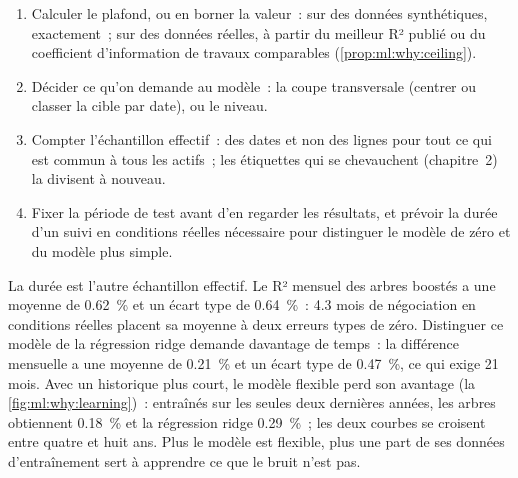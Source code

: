 \begin{method}\label{met:ml:why:before}
\begin{enumerate}
\item Calculer le plafond, ou en borner la valeur~: sur des données synthétiques, exactement~; sur des données réelles, à partir du meilleur R² publié ou
du coefficient d'information de travaux comparables (\cref{prop:ml:why:ceiling}).
\item Décider ce qu'on demande au modèle~: la coupe transversale (centrer ou classer la cible par date), ou le niveau.
\item Compter l'échantillon effectif~: des dates et non des lignes pour tout ce qui est commun à tous les actifs~; les étiquettes qui se chevauchent
(chapitre~2) la divisent à nouveau.
\item Fixer la période de test avant d'en regarder les résultats, et prévoir la durée d'un suivi en conditions réelles nécessaire pour distinguer le modèle de zéro et
du modèle plus simple.
\end{enumerate}
\end{method}

La durée est l'autre échantillon effectif. Le R² mensuel des arbres boostés a une moyenne de 0.62~\% et un écart type
de 0.64~\%~: 4.3 mois de négociation en conditions réelles placent sa moyenne à deux erreurs types de zéro. Distinguer ce modèle de la régression ridge demande
davantage de temps~: la différence mensuelle a une moyenne de 0.21~\% et un écart type de 0.47~\%, ce qui exige 21 mois. Avec un historique plus court, le modèle
flexible perd son avantage (la \cref{fig:ml:why:learning})~: entraînés sur les seules deux dernières années, les arbres
obtiennent 0.18~\% et la régression ridge 0.29~\%~; les deux courbes se croisent entre quatre et huit ans. Plus le modèle est flexible, plus une part
de ses données d'entraînement sert à apprendre ce que le bruit n'est pas.

